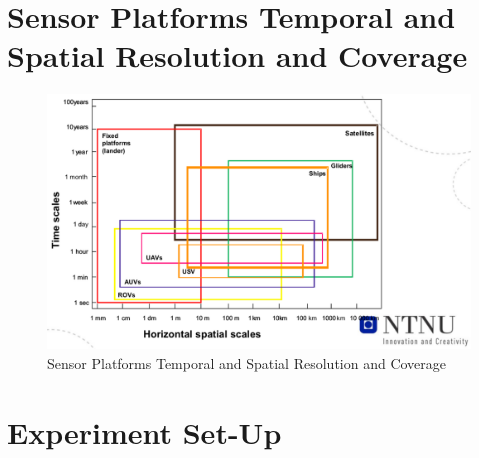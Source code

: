 \begin{appendices}

\chapter{Sensor Platforms Temporal and Spatial Resolution and Coverage}
\label{app:platform}

\begin{figure}
    \centering
    \includegraphics[width= 18cm]{Images/appendix/platforms.png}
    \caption{Sensor Platforms Temporal and Spatial Resolution and Coverage}
    \label{fig:platforms}
\end{figure}

\chapter{Experiment Set-Up}
\label{app:method}


\end{appendices}
